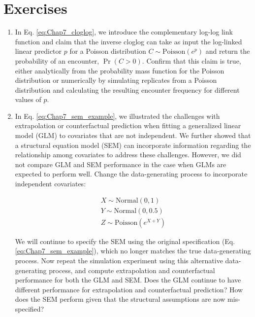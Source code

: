 \section{Exercises}

\begin{enumerate}
    \item In Eq. \ref{eq:Chap7_cloglog}, we introduce the complementary log-log link function and claim that the inverse cloglog can take as input the log-linked linear predictor \(p\) for a Poisson distribution \( C \sim \mathrm{Poisson}(e^p)\) and return the probability of an encounter, \(\Pr(C > 0)\).  Confirm that this claim is true, either analytically from the probability mass function for the Poisson distribution or numerically by simulating replicates from a Poisson distribution and calculating the resulting encounter frequency for different values of \(p\).   

    \item In Eq. \ref{eq:Chap7_sem_example}, we illustrated the challenges with extrapolation or counterfactual prediction when fitting a generalized linear model (GLM) to covariates that are not independent.  We further showed that a structural equation model (SEM) can incorporate information regarding the relationship among covariates to address these challenges.  However, we did not compare GLM and SEM performance in the case when GLMs are expected to perform well.  Change the data-generating process to incorporate independent covariates:

\begin{equation} \label{eq:Chap7_sem_exercise}
\begin{gathered}
   X \sim \mathrm{Normal}(0,1) \\ 
   Y \sim \mathrm{Normal}(0,0.5)  \\
   Z \sim \mathrm{Poisson}\left(e^{X+Y}\right)
\end{gathered}
\end{equation}

    We will continue to specify the SEM using the original specification (Eq. \ref{eq:Chap7_sem_example}), which no longer matches the true data-generating process.  Now repeat the simulation experiment using this alternative data-generating process, and compute extrapolation and counterfactual performance for both the GLM and SEM.  Does the GLM continue to have different performance for extrapolation and counterfactual prediction?  How does the SEM perform given that the structural assumptions are now mis-specified?

\end{enumerate}

